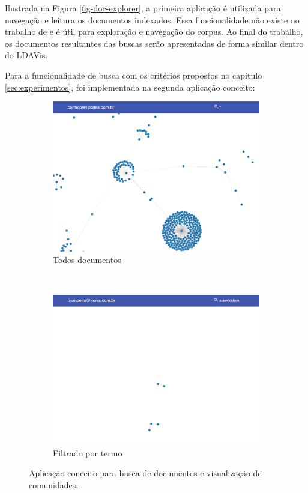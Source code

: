 \documentclass[12pt,a4paper]{article}
\begin{document}
Ilustrada na Figura \ref{fig-doc-explorer}, a primeira aplicação é utilizada para navegação e leitura os documentos
 indexados. Essa funcionalidade não existe no trabalho de  e é útil para exploração e navegação do corpus.
 Ao final do trabalho, os documentos resultantes das buscas serão apresentadas de forma similar dentro do LDAVis. 

Para a funcionalidade de busca com os critérios propostos no capítulo \ref{sec:experimentos}, foi implementada na segunda aplicação conceito:

\begin{figure}[H]
  \centering
  \begin{subfigure}[b]{0.48\textwidth}
      \includegraphics[width=\textwidth]{images/figure_9.png}
      \caption{Todos documentos}
      \label{fig-search-all}
  \end{subfigure}
  ~ %
  \begin{subfigure}[b]{0.48\textwidth}
      \includegraphics[width=\textwidth]{images/figure_10.png}
      \caption{Filtrado por termo}
      \label{fig-search-filtered}
  \end{subfigure}
  \caption{Aplicação conceito para busca de documentos e visualização de comunidades.}
  \label{fig-search-explorer}
\end{figure}
\end{document}
